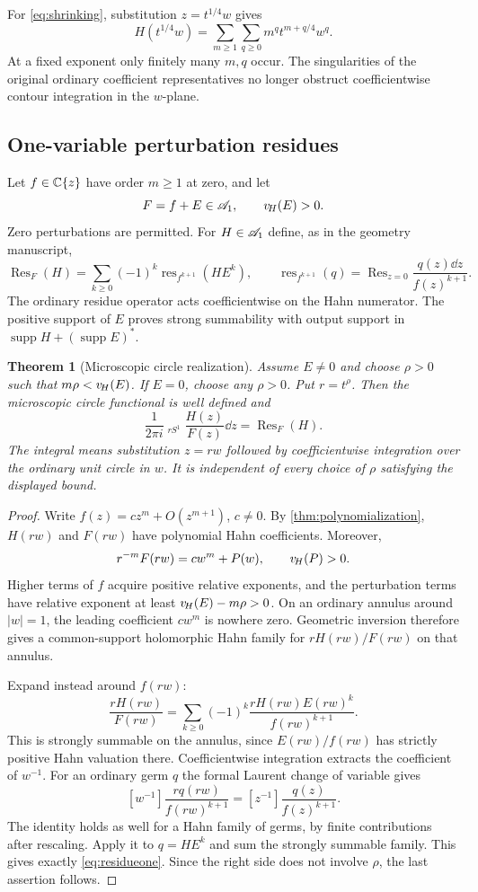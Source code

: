 \documentclass[11pt,letterpaper]{article}
\newtheorem{theorem}{Theorem}[section]
\theoremstyle{definition}
\theoremstyle{remark}
\newcommand{\supp}{\operatorname{supp}}\newcommand{\Res}{\operatorname{Res}}
\newcommand{\res}{\operatorname{res}}\newcommand{\Wind}{\operatorname{Wind}}
\newcommand{\HCoint}{\mathop{\oint^{\!H}}\nolimits}
\numberwithin{equation}{section}
\begin{document}
For \eqref{eq:shrinking}, substitution $z=t^{1/4}w$ gives
\[
 H(t^{1/4}w)=\sum_{m\ge1}\sum_{q\ge0}m^q t^{m+q/4}w^q.
\]
At a fixed exponent only finitely many $m,q$ occur. The singularities of the original ordinary coefficient representatives no longer obstruct coefficientwise contour integration in the $w$-plane.

\subsection{One-variable perturbation residues}
Let $f\in\mathbb C\{z\}$ have order $m\ge1$ at zero, and let
\[
 F=f+E\in\mathscr A_1,\qquad v_{\!H}(E)>0.
\]
Zero perturbations are permitted. For $H\in\mathscr A_1$ define, as in the geometry manuscript,
\begin{equation}\label{eq:residueone}
 \Res_F(H)=\sum_{k\ge0}(-1)^k\res_{f^{k+1}}(HE^k),
 \qquad
 \res_{f^{k+1}}(q)=\Res_{z=0}\frac{q(z)\dd z}{f(z)^{k+1}}.
\end{equation}
The ordinary residue operator acts coefficientwise on the Hahn numerator. The positive support of $E$ proves strong summability with output support in $\supp H+(\supp E)^*$.

\begin{theorem}[Microscopic circle realization]\label{thm:microcircle}
Assume $E\ne0$ and choose $\rho>0$ such that $m\rho<v_{\!H}(E)$. If $E=0$, choose any $\rho>0$. Put $r=t^\rho$. Then the microscopic circle functional is well defined and
\begin{equation}\label{eq:microcircle}
 \boxed{\qquad
 \frac1{2\pi i}\HCoint_{rS^1}\frac{H(z)}{F(z)}\dd z
 =\Res_F(H).
 \qquad}
\end{equation}
The integral means substitution $z=rw$ followed by coefficientwise integration over the ordinary unit circle in $w$. It is independent of every choice of $\rho$ satisfying the displayed bound.
\end{theorem}
\begin{proof}
Write $f(z)=cz^m+O(z^{m+1})$, $c\ne0$. By \cref{thm:polynomialization}, $H(rw)$ and $F(rw)$ have polynomial Hahn coefficients. Moreover,
\[
 r^{-m}F(rw)=cw^m+P(w),\qquad v_{\!H}(P)>0.
\]
Higher terms of $f$ acquire positive relative exponents, and the perturbation terms have relative exponent at least $v_{\!H}(E)-m\rho>0$. On an ordinary annulus around $|w|=1$, the leading coefficient $cw^m$ is nowhere zero. Geometric inversion therefore gives a common-support holomorphic Hahn family for $rH(rw)/F(rw)$ on that annulus.

Expand instead around $f(rw)$:
\[
 \frac{rH(rw)}{F(rw)}
 =\sum_{k\ge0}(-1)^k
 \frac{rH(rw)E(rw)^k}{f(rw)^{k+1}}.
\]
This is strongly summable on the annulus, since $E(rw)/f(rw)$ has strictly positive Hahn valuation there. Coefficientwise integration extracts the coefficient of $w^{-1}$. For an ordinary germ $q$ the formal Laurent change of variable gives
\[
 [w^{-1}]\frac{rq(rw)}{f(rw)^{k+1}}
 =[z^{-1}]\frac{q(z)}{f(z)^{k+1}}.
\]
The identity holds as well for a Hahn family of germs, by finite contributions after rescaling. Apply it to $q=HE^k$ and sum the strongly summable family. This gives exactly \eqref{eq:residueone}. Since the right side does not involve $\rho$, the last assertion follows.
\end{proof}
\end{document}
